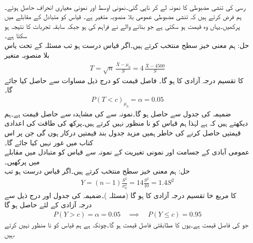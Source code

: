 \quad {}\\
رسی کی تنشی مضبوطی  کا نمونہ لے کر ناپی گئی۔نمونی اوسط  اور نمونی معیاری انحراف  حاصل ہوئے۔ ہم فرض کرتے ہیں کہ تنشی مضبوطی عمومی بلا منصوبہ  متغیر ہے۔ قیاس  کو متبادل  کے مقابلے میں پرکھیں۔یہاں  وہ قیمت ہو سکتی ہے جو بنانے والے نے فراہم کی ہو جبکہ  سابقہ تجربات کا نتیجہ ہو سکتا ہے۔\\
حل:\quad
ہم معنی خیز سطح  منتخب کرتے ہیں۔اگر قیاس درست ہو تب مسئلہ  کے تحت یاس بلا منصوبہ متغیر
\begin{align*}
T=\sqrt{n}\,\frac{\overline{X}-\mu_0}{S}=4\, \frac{\overline{X}-4500}{S}
\end{align*}
کا  تقسیم  درجہ آزادی کا ہو گا۔ فاصل قیمت  کو درج ذیل مساوات سے حاصل کیا جائے گا۔
\begin{align*}
P(T<c)_{\mu_0}=\alpha=0.05
\end{align*}
ضمیمہ  کی جدول  سے  حاصل ہو گا۔نمونہ سے  کی مشاہدہ سے حاصل قیمت  ہے۔ہم دیکھتے ہیں کہ  ہے لہٰذا ہم قیاس کو نا منظور نہیں کرتے ہیں۔پرکھ کی طاقت کی اعدادی قیمتیں حاصل کرنے کی خاطر ہمیں مزید جدول بند قیمتیں درکار ہوں گی جن پر اس کتاب میں غور نہیں کیا جائے گا۔
\quad {}\\
عمومی آبادی کے  جسامت اور نمونی تغیریت   کے نمونہ سے قیاس  کو متبادل
  میں مقابلے میں پرکھیں۔\\
حل:\quad
ہم معنی خیز سطح  منتخب کرتے ہیں۔اگر قیاس درست ہو تب 
\begin{align*}
Y=(n-1)\frac{S^2}{\sigma^2_0}=14\frac{S^2}{10}=1.4S^2
\end{align*}
کا مربع خا تقسیم  درجہ آزادی کا ہو گا (مسئلہ )۔ضمیمہ  کی جدول  اور درج ذیل سے   درجہ آزادی کے لئے    حاصل ہو گا 
\begin{align*}
P(Y>c)=\alpha=0.05\quad \implies \quad P(Y\le c)=0.95
\end{align*}
جو  کی فاصل قیمت ہے۔یوں  کا مطابقتی فاصل قیمت  ہو گا۔چونکہ  ہے ہم قیاس کو نا منظور نہیں کرتے ہیں،

